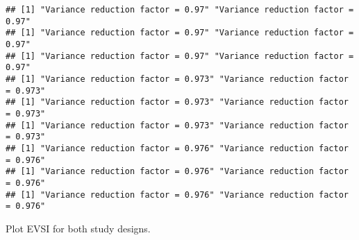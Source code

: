 \documentclass[
]{article}
\begin{document}
\begin{verbatim}
## [1] "Variance reduction factor = 0.97" "Variance reduction factor = 0.97"
## [1] "Variance reduction factor = 0.97" "Variance reduction factor = 0.97"
## [1] "Variance reduction factor = 0.97" "Variance reduction factor = 0.97"
## [1] "Variance reduction factor = 0.973" "Variance reduction factor = 0.973"
## [1] "Variance reduction factor = 0.973" "Variance reduction factor = 0.973"
## [1] "Variance reduction factor = 0.973" "Variance reduction factor = 0.973"
## [1] "Variance reduction factor = 0.976" "Variance reduction factor = 0.976"
## [1] "Variance reduction factor = 0.976" "Variance reduction factor = 0.976"
## [1] "Variance reduction factor = 0.976" "Variance reduction factor = 0.976"
\end{verbatim}

Plot EVSI for both study designs.
\end{document}
